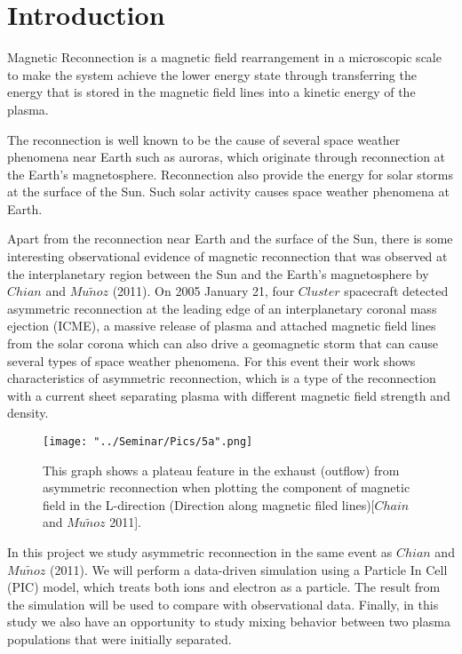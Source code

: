 \documentclass[12pt, a4paper]{article}
\begin{document}
\section{Introduction}
Magnetic Reconnection is a magnetic field rearrangement in a microscopic scale to make the system achieve the lower energy state through transferring the energy that is stored in the magnetic field lines into a kinetic energy of the plasma.\par The reconnection is well known to be the cause of several space weather phenomena near Earth such as auroras, which originate through reconnection at the Earth's magnetosphere. Reconnection also provide the energy for solar storms at the surface of the Sun. Such solar activity  causes space weather phenomena at Earth.\par Apart from the reconnection near Earth and the surface of the Sun, there is some  interesting observational evidence of magnetic reconnection that was observed at the interplanetary region between the Sun and the Earth's magnetosphere by $Chian$ and $Mu$$\tilde{n}$$oz$ (2011). On 2005 January 21, four $Cluster$ spacecraft detected asymmetric reconnection at the leading edge of an interplanetary coronal mass ejection (ICME), a massive release of plasma and attached magnetic field lines from the solar corona which can also drive a geomagnetic storm that can cause several types of space weather phenomena. For this event their work shows characteristics of asymmetric reconnection, which is a type of the reconnection with a current sheet separating plasma with different magnetic field strength and density. \par
\begin{figure}[hbtp]
\centering
\texttt{[image: "../Seminar/Pics/5a".png]}
\caption{This graph shows a plateau feature in the exhaust (outflow) from asymmetric reconnection when plotting the component of magnetic field in the L-direction (Direction along magnetic filed lines)[$Chain$ and $Mu$$\tilde{n}$$oz$ 2011]. }
\end{figure}
\newpage
In this project we study asymmetric reconnection in the same event as $Chian$ and $Mu$$\tilde{n}$$oz$ (2011). We will perform a data-driven simulation using a Particle In Cell (PIC) model, which treats both ions and electron as a particle. The result from the simulation will be used to compare with observational data. Finally, in this study we also have an opportunity to study mixing behavior between two plasma populations that were initially separated.\par
\end{document}
